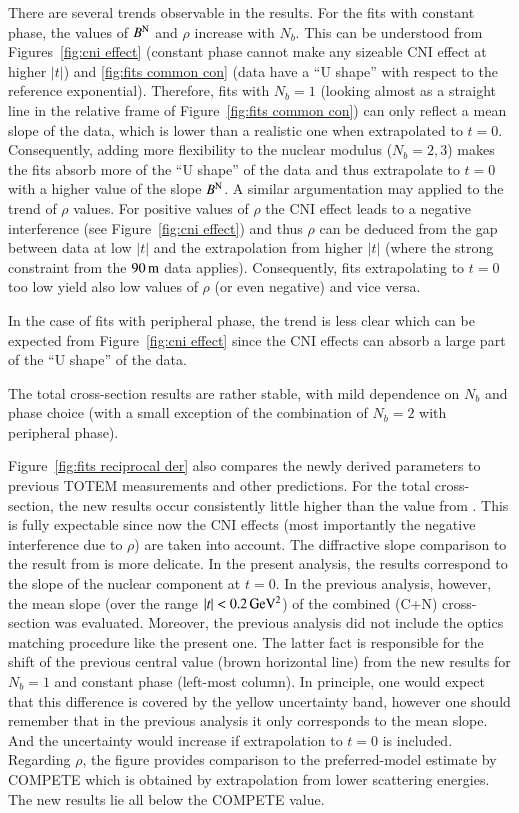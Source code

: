 There are several trends observable in the results. For the fits with constant phase, the values of $B^{\rm N}$ and $\rho$ increase with $N_b$. This can be understood from Figures~\ref{fig:cni effect} (constant phase cannot make any sizeable CNI effect at higher $|t|$) and \ref{fig:fits common con} (data have a ``U shape'' with respect to the reference exponential). Therefore, fits with $N_b = 1$ (looking almost as a straight line in the relative frame of Figure~\ref{fig:fits common con}) can only reflect a mean slope of the data, which is lower than a realistic one when extrapolated to $t = 0$. Consequently, adding more flexibility to the nuclear modulus ($N_b = 2, 3$) makes the fits absorb more of the ``U shape'' of the data and thus extrapolate to $t = 0$ with a higher value of the slope $B^{\rm N}$. A similar argumentation may applied to the trend of $\rho$ values. For positive values of $\rho$ the CNI effect leads to a negative interference (see Figure~\ref{fig:cni effect}) and thus $\rho$ can be deduced from the gap between data at low $|t|$ and the extrapolation from higher $|t|$ (where the strong constraint from the $90\,{\rm m}$ data applies). Consequently, fits extrapolating to $t = 0$ too low yield also low values of $\rho$ (or even negative) and vice versa.

In the case of fits with peripheral phase, the trend is less clear which can be expected from Figure~\ref{fig:cni effect} since the CNI effects can absorb a large part of the ``U shape'' of the data.

The total cross-section results are rather stable, with mild dependence on $N_b$ and phase choice (with a small exception of the combination of $N_b = 2$ with peripheral phase).

Figure~\ref{fig:fits reciprocal der} also compares the newly derived parameters to previous TOTEM measurements and other predictions. For the total cross-section, the new results occur consistently little higher than the value from \cite{prl111}. This is fully expectable since now the CNI effects (most importantly the negative interference due to $\rho$) are taken into account. The diffractive slope comparison to the result from \cite{prl111} is more delicate. In the present analysis, the results correspond to the slope of the nuclear component at $t = 0$. In the previous analysis, however, the mean slope (over the range $|t| < 0.2\,{\rm GeV^2}$) of the combined (C+N) cross-section was evaluated. Moreover, the previous analysis did not include the optics matching procedure like the present one. The latter fact is responsible for the shift of the previous central value (brown horizontal line) from the new results for $N_b = 1$ and constant phase (left-most column). In principle, one would expect that this difference is covered by the yellow uncertainty band, however one should remember that in the previous analysis it only corresponds to the mean slope. And the uncertainty would increase if extrapolation to $t = 0$ is included.
%
Regarding $\rho$, the figure provides comparison to the preferred-model estimate by COMPETE \cite{compete} which is obtained by extrapolation from lower scattering energies. The new results lie all below the COMPETE value.

